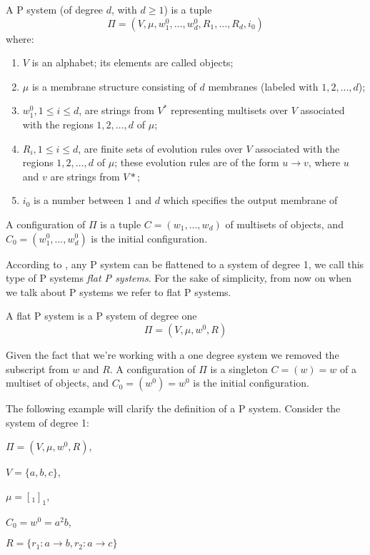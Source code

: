 \begin{definition}[P system]
A P system (of degree $d$, with $d \geq 1$) is a tuple
\[ \Pi = (V,\mu,w^0_1,...,w^0_d,R_1,...,R_d, i_0)\]
where:
\begin{enumerate}
  \item $V$ is an alphabet; its elements are called objects;
  \item $\mu$ is a membrane structure consisting of $d$ membranes (labeled with $1,2,...,d$);
  \item $w^0_1, 1 \leq i \leq d$, are strings from $V^*$ representing multisets over $V$ associated
  with the regions $1,2,...,d$ of $\mu$;
  \item $R_i, 1 \leq i \leq d$, are finite sets of evolution rules over $V$ associated 
  with the regions $1,2,...,d$ of $\mu$; these evolution rules are of the form $u \rightarrow v$,
  where $u$ and $v$ are strings from $V*$;
  \item $i_0$ is a number between 1 and $d$ which specifies the output membrane of %
\end{enumerate}
A configuration of $\Pi$ is a tuple $C=(w_1,...,w_d)$ of multisets of objects, and 
$C_0=(w^0_1,...,w^0_d)$ is the initial configuration.
\end{definition}

According to \cite{agrigoroaiei2010flattening}, any P system can be flattened to a system of degree 1, we call this type of P systems \textit{flat P systems}.
For the sake of simplicity, from now on when we talk about P systems we refer to flat P systems.

\begin{definition}
A flat P system is a P system of degree one
\[ \Pi = (V,\mu,w^0,R) \]

Given the fact that we're working with a one degree system we removed the subscript from $w$ and $R$. 
A configuration of $\Pi$ is a singleton $C=(w)=w$ of a multiset of objects, and 
$C_0=(w^0)=w^0$ is the initial configuration.
\end{definition}

The following example will clarify the definition of a P system.
Consider the system of degree 1:
\begin{description}
   \item $\Pi=(V,\mu,w^0,R)$,
   \item $V=\{a,b,c\}$,
   \item $\mu=[_{1}]_{1}$,
   \item $C_0=w^0=a^2b$,
   \item $R=\{r_1:a \rightarrow b, r_2:a \rightarrow c\}$
\end{description}

